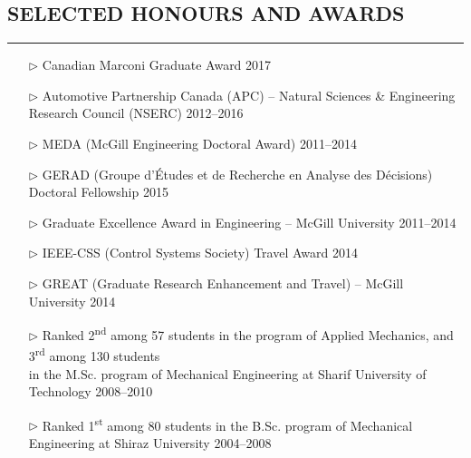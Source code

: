\documentclass{article}
\begin{document}

\subsection*{SELECTED HONOURS AND AWARDS}
\hrule
\vspace{7pt}


\begin{itemize}
\setlength\itemsep{-3 pt}
\setlength{\leftmargin}{-18pt}
\item[$\triangleright$] {Canadian Marconi Graduate Award} \hfill {2017}
\item[$\triangleright$] {Automotive Partnership Canada (APC) -- Natural Sciences \& Engineering Research Council (NSERC)} \hfill {2012--2016}
\item[$\triangleright$] {MEDA (McGill Engineering Doctoral Award)} \hfill {2011--2014}
\item[$\triangleright$] GERAD  (Groupe d'{\'E}tudes et de Recherche en Analyse des D{\'e}cisions) Doctoral Fellowship \hfill 2015
\item[$\triangleright$] Graduate Excellence Award in Engineering -- McGill University \hfill 2011--2014
\item[$\triangleright$] IEEE-CSS (Control Systems Society) Travel Award \hfill 2014
\item[$\triangleright$] GREAT (Graduate Research Enhancement and Travel) -- McGill University  \hfill 2014
\item[$\triangleright$] Ranked 2\textsuperscript{nd} among 57 students in the program of Applied Mechanics, and 3\textsuperscript{rd} among 130 students \\ in the M.Sc. program of Mechanical Engineering at Sharif University of Technology \hfill {2008--2010}
\item[$\triangleright$] Ranked 1\textsuperscript{st} among 80 students in the B.Sc. program of Mechanical Engineering at Shiraz University \hfill {2004--2008}
\end{itemize}
\end{document}
